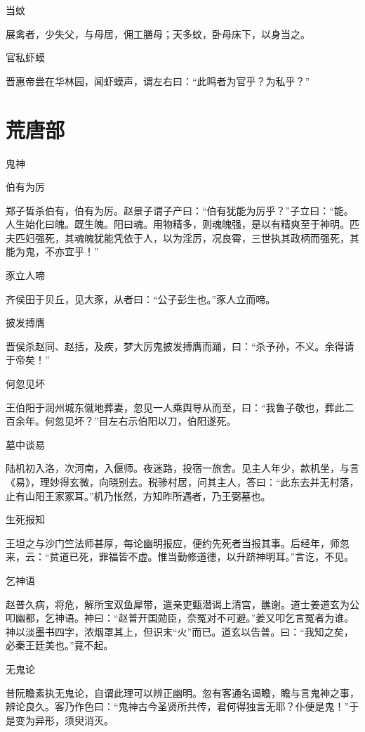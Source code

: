\documentclass[a4paper,12pt,UTF8,twoside]{ctexbook}
\begin{document}
    当蚊
    
    展禽者，少失父，与母居，佣工膳母；天多蚊，卧母床下，以身当之。
    
    官私虾蟆
    
    晋惠帝尝在华林园，闻虾蟆声，谓左右曰：“此鸣者为官乎？为私乎？”
    
    \part{荒唐部}
    
    鬼神
    
    伯有为厉
    
    郑子皙杀伯有，伯有为厉。赵景子谓子产曰：“伯有犹能为厉乎？”子立曰：“能。人生始化曰魄。既生魄。阳曰魂。用物精多，则魂魄强，是以有精爽至于神明。匹夫匹妇强死，其魂魄犹能凭依于人，以为淫厉，况良霄，三世执其政柄而强死，其能为鬼，不亦宜乎！”
    
    豕立人啼
    
    齐侯田于贝丘，见大豕，从者曰：“公子彭生也。”豕人立而啼。
    
    披发搏膺
    
    晋侯杀赵同、赵括，及疾，梦大厉鬼披发搏膺而踊，曰：“杀予孙，不义。余得请于帝矣！”
    
    何忽见坏
    
    王伯阳于润州城东僦地葬妻，忽见一人乘舆导从而至，曰：“我鲁子敬也，葬此二百余年。何忽见坏？”目左右示伯阳以刀，伯阳遂死。
    
    墓中谈易
    
    陆机初入洛，次河南，入偃师。夜迷路，投宿一旅舍。见主人年少，款机坐，与言《易》，理妙得玄微，向晓别去。税骖村居，问其主人，答曰：“此东去并无村落，止有山阳王家冢耳。”机乃怅然，方知昨所遇者，乃王弼墓也。
    
    生死报知
    
    王坦之与沙门竺法师甚厚，每论幽明报应，便约先死者当报其事。后经年，师忽来，云：“贫道已死，罪福皆不虚。惟当勤修道德，以升跻神明耳。”言讫，不见。
    
    乞神语
    
    赵普久病，将危，解所宝双鱼犀带，遣亲吏甄潜谒上清宫，醮谢。道士姜道玄为公叩幽都，乞神语。神曰：“赵普开国勋臣，奈冤对不可避。”姜又叩乞言冤者为谁。神以淡墨书四字，浓烟罩其上，但识末“火”而已。道玄以告普。曰：“我知之矣，必秦王廷美也。”竟不起。
    
    无鬼论
    
    昔阮瞻素执无鬼论，自谓此理可以辨正幽明。忽有客通名谒瞻，瞻与言鬼神之事，辨论良久。客乃作色曰：“鬼神古今圣贤所共传，君何得独言无耶？仆便是鬼！”于是变为异形，须臾消灭。
    
\end{document}
